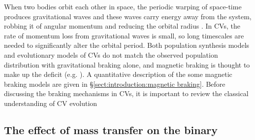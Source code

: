 When two bodies orbit each other in space, the periodic warping of space-time produces gravitational waves \citep{einstein1918} and these waves carry energy away from the system, robbing it of angular momentum and reducing the orbital radius \citep{Paczynski1967}. In CVs, the rate of momentum loss from gravitational waves is small, so long timescales are needed to significantly alter the orbital period.
Both population synthesis models and evolutionary models of CVs do not match the observed population distribution with gravitational braking alone, and magnetic braking is thought to make up the deficit (e.g. \citet{kolb1993a, kolb1993, Davis2008, garraffo2018}).
A quantitative description of the some magnetic braking models are given in \S\ref{sect:introduction:magnetic braking}. Before discussing the braking mechanisms in CVs, it is important to review the classical understanding of CV evolution


\subsection{The effect of mass transfer on the binary}
\label{sect:introduction:stability criterion}


